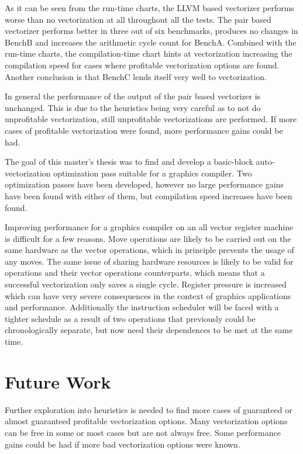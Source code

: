 \documentclass[12pt,a4paper,onecolumn,twoside,openright]{report}
\begin{document}
As it can be seen from the run-time charts, the LLVM based vectorizer performs worse than no vectorization at all throughout all the tests. The pair based vectorizer performs better in three out of six benchmarks, produces no changes in BenchB and increases the arithmetic cycle count for BenchA.
Combined with the run-time charts, the compilation-time chart hints at vectorization increasing the compilation speed for cases where profitable vectorization options are found.
Another conclusion is that BenchC lends itself very well to vectorization.

In general the performance of the output of the pair based vectorizer is unchanged. This is due to the heuristics being very careful as to not do unprofitable vectorization, still unprofitable vectorizations are performed. If more cases of profitable vectorization were found, more performance gains could be had.

The goal of this master's thesis was to find and develop a basic-block auto-vectorization optimization pass suitable for a graphics compiler. Two optimization passes have been developed, however no large performance gains have been found with either of them, but compilation speed increases have been found.

Improving performance for a graphics compiler on an all vector register machine is difficult for a few reasons. Move operations are likely to be carried out on the same hardware as the vector operations, which in principle prevents the usage of any moves. The same issue of sharing hardware resources is likely to be valid for operations and their vector operations counterparts, which means that a successful vectorization only saves a single cycle. Register pressure is increased which can have very severe consequences in the context of graphics applications and performance. Additionally the instruction scheduler will be faced with a tighter schedule as a result of two operations that previously could be chronologically separate, but now need their dependences to be met at the same time.

\section{Future Work}

Further exploration into heuristics is needed to find more cases of guaranteed or almost guaranteed profitable vectorization options. Many vectorization options can be free in some or most cases but are not always free. Some performance gains could be had if more bad vectorization options were known.
\end{document}
